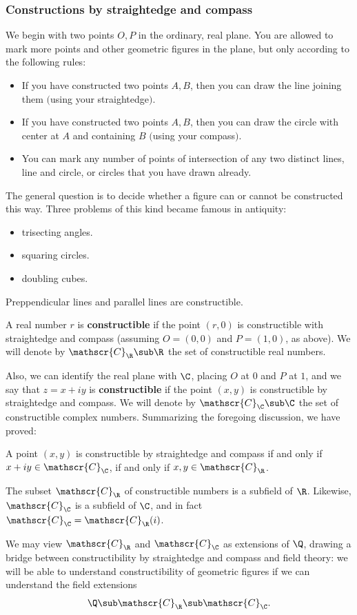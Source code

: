 \subsubsection{Constructions by straightedge and compass}
We begin with two points $O,P$ in the ordinary, real plane. You are allowed to mark more points and other geometric figures in the plane, but only according to the following rules:
\begin{itemize}
\item If you have constructed two points $A,B$, then you can draw the line joining them $($using your straightedge$)$.
\item If you have constructed two points $A,B$, then you can draw the circle with center at $A$ and containing $B$ $($using your compass$)$.
\item You can mark any number of points of intersection of any two distinct lines, line and circle, or circles that you have drawn already.
\end{itemize}
The general question is to decide whether a figure can or cannot be constructed this way. Three problems of this kind became famous in antiquity:
\begin{itemize}
\item trisecting angles.
\item squaring circles.
\item doubling cubes.
\end{itemize}
Preppendicular lines and parallel lines are constructible.
\begin{definition}
A real number $r$ is \textbf{constructible} if the point $(r,0)$ is constructible with straightedge and compass (assuming $O=(0,0)$ and $P=(1,0)$, as above). We will denote by $\mathscr{C}_{\R}\sub\R$ the set of constructible real numbers.
\end{definition}
Also, we can identify the real plane with $\C$, placing $O$ at $0$ and $P$ at $1$, and we say that $z=x+iy$ is \textbf{constructible} if the point $(x,y)$ is constructible by straightedge and compass. We will denote by $\mathscr{C}_{\C}\sub\C$ the set of constructible complex numbers.
Summarizing the foregoing discussion, we have proved:
\begin{proposition}
A point $(x,y)$ is constructible by straightedge and compass if and only if $x+iy\in\mathscr{C}_{\C}$, if and only if $x,y\in\mathscr{C}_{\R}$.
\end{proposition}
\begin{proposition}\label{field constructible number}
The subset $\mathscr{C}_{\R}$ of constructible numbers is a subfield of $\R$. Likewise, $\mathscr{C}_{\C}$ is a subfield of $\C$, and in fact $\mathscr{C}_\C=\mathscr{C}_\R(i)$.
\end{proposition}
We may view $\mathscr{C}_{\R}$ and $\mathscr{C}_{\C}$ as extensions of $\Q$, drawing a bridge between constructibility by straightedge and compass and field theory: we will be able to understand constructibility of geometric figures if we can understand the field extensions
\[\Q\sub\mathscr{C}_{\R}\sub\mathscr{C}_{\C}.\]
